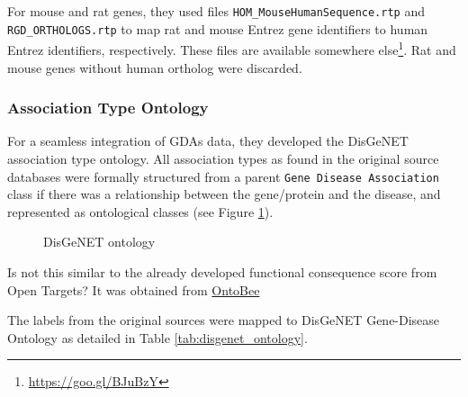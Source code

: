 For mouse and rat genes, they used files \texttt{HOM\_MouseHumanSequence.rtp} and \texttt{RGD\_ORTHOLOGS.rtp} to map rat and mouse Entrez gene identifiers to human Entrez identifiers, respectively. These files are available somewhere else\footnote{\url{https://goo.gl/BJuBzY}}. Rat and mouse genes without human ortholog were discarded.

\subsubsection{Association Type Ontology}
For a seamless integration of GDAs data, they developed the DisGeNET association type ontology. All association types as found in the original source databases were formally structured from a parent \texttt{Gene Disease Association} class if there was a relationship between the gene/protein and the disease, and represented as ontological classes (see Figure \ref{fig:disgenet_ontology}).

\begin{figure}[H]
    \caption{DisGeNET ontology \cite{DisGeNET2015}  \label{fig:disgenet_ontology}}
\end{figure}

Is not this similar to the already developed functional consequence score from Open Targets? It was obtained from \href{http://www.ontobee.org/ontology/SO?iri=http://purl.obolibrary.org/obo/SO_0001566}{OntoBee}

The labels from the original sources were mapped to DisGeNET Gene-Disease Ontology as detailed in Table \ref{tab:disgenet_ontology}.

